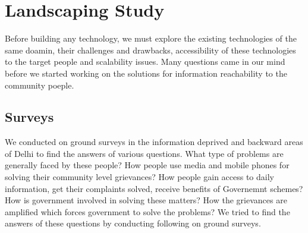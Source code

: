 \chapter{Landscaping Study}

Before building any technology, we must explore the existing technologies of the same doamin, their challenges and drawbacks, accessibility of these technologies to the target people and scalability issues. Many questions came in our mind before we started working on the solutions for information reachability to the community poeple.

\section {Surveys}
We conducted on ground surveys in the information deprived and backward areas of Delhi to find the answers of various questions. What type of problems are generally faced by these people? How people use media and mobile phones for solving their community level grievances? How people gain access to daily information, get their complaints solved, receive benefits of Governemnt schemes? How is government involved in solving these matters? How the grievances are amplified which forces government to solve the problems? We tried to find the answers of these questions by conducting following on ground surveys.

